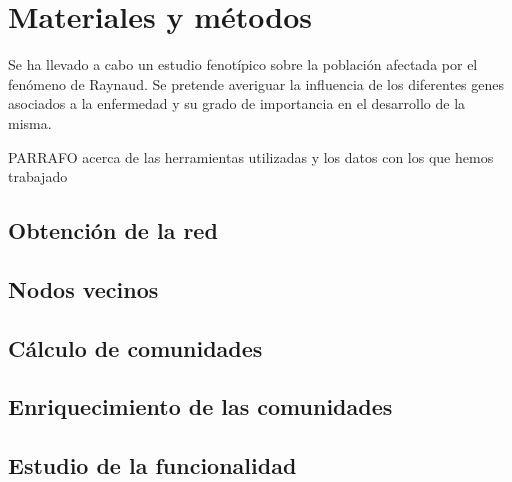 \section{Materiales y métodos}

Se ha llevado a cabo un estudio fenotípico sobre la población afectada por el fenómeno de Raynaud. Se pretende averiguar la influencia de los diferentes genes asociados a la enfermedad y su grado de importancia en el desarrollo de la misma.

PARRAFO acerca de las herramientas utilizadas y los datos con los que hemos trabajado

\subsection{Obtención de la red}
\subsection{Nodos vecinos}
\subsection{Cálculo de comunidades}
\subsection{Enriquecimiento de las comunidades}
\subsection{Estudio de la funcionalidad}